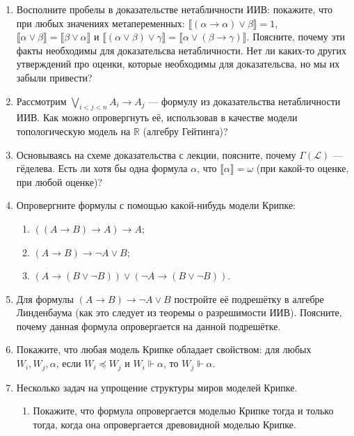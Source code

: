\documentclass[10pt,a4paper,oneside]{article}
\begin{document}
\begin{enumerate}
\item Восполните пробелы в доказательстве нетабличности ИИВ: покажите, что при любых
значениях метапеременных:
 $\llbracket (\alpha\rightarrow\alpha)\vee\beta \rrbracket = 1$,
 $\llbracket\alpha\vee\beta\rrbracket = \llbracket\beta\vee\alpha\rrbracket$ и
 $\llbracket(\alpha\vee\beta)\vee\gamma\rrbracket = \llbracket\alpha\vee(\beta\rightarrow\gamma)\rrbracket$.
Поясните, почему эти факты необходимы для доказательсва нетабличности. 
Нет ли каких-то других утверждений про оценки, которые необходимы для доказательсва, но мы их забыли привести?

\item Рассмотрим $\bigvee_{i < j < n} A_i \rightarrow A_j$ --- формулу из доказательства нетабличности ИИВ.
Как можно опровергнуть её, использовав в качестве модели топологическую модель на $\mathbb{R}$ (алгебру
Гейтинга)?

\item Основываясь на схеме доказательства с лекции, поясните, почему $\Gamma(\mathcal{L})$ --- гёделева.
Есть ли хотя бы одна формула $\alpha$, что $\llbracket\alpha\rrbracket = \omega$ (при какой-то оценке,
при любой оценке)?

\item Опровергните формулы с помощью какой-нибудь модели Крипке:
\begin{enumerate}
\item $((A\rightarrow B) \rightarrow A) \rightarrow A$;
\item $(A\rightarrow B) \rightarrow \neg A \vee B$;
\item $(A \rightarrow (B \vee \neg B)) \vee (\neg A \rightarrow (B \vee \neg B))$.
\end{enumerate}

\item Для формулы $(A\rightarrow B) \rightarrow \neg A \vee B$ постройте её подрешётку в алгебре Линденбаума
(как это следует из теоремы о разрешимости ИИВ). Поясните, почему данная формула опровергается на данной 
подрешётке.

\item Покажите, что любая модель Крипке обладает свойством: для любых $W_i, W_j, \alpha$, 
если $W_i \preceq W_j$ и $W_i \Vdash \alpha$, то $W_j \Vdash \alpha$.

\item Несколько задач на упрощение структуры миров моделей Крипке.

\begin{enumerate}
\item Покажите, что формула опровергается моделью Крипке тогда и только тогда, когда она
опровергается древовидной моделью Крипке.


\end{enumerate}
\end{enumerate}
\end{document}
